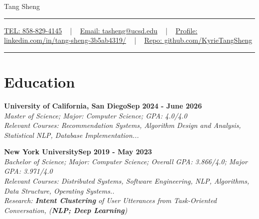 \documentclass[letterpaper,10pt]{article}
\newcommand{\documentTitle}[2]{
  \begin{center}
    {\Huge\color{accentTitle} #1}
    \vspace{10pt}
    {\color{accentLine} \hrule}
    \vspace{2pt}
    \footnotesize{#2}
    \vspace{2pt}
    {\color{accentLine} \hrule}
  \end{center}
}
\newcommand{\heading}[2]{
  \hspace{10pt}#1\hfill#2\\
}
\newcommand{\headingBf}[2]{
  \heading{\textbf{#1}}{\textbf{#2}}
}
\newcommand{\headingIt}[2]{
  \heading{\textit{#1}}{\textit{#2}}
}
\begin{document}

  \documentTitle{Tang Sheng}{
    \href{tel:8588294145}{
      \raisebox{-0.05\height} TEL: 858-829-4145} ~ | ~
    \href{tasheng@ucsd.edu}{
      \raisebox{-0.15\height} Email: tasheng@ucsd.edu} ~ | ~
     \href{https://www.linkedin.com/in/tang-sheng-3b5ab4319/}{
       \raisebox{-0.15\height} Profile: linkedin.com/in/tang-sheng-3b5ab4319/} ~ | ~
     \href{https://github.com/KyrieTangSheng}{
       \raisebox{-0.15\height} Repo: github.com/KyrieTangSheng}
}

  
  




  \section{Education}

  \headingBf{University of California, San Diego}{Sep 2024 - June 2026} 
  \headingIt{Master of Science; Major: Computer Science; GPA: 4.0/4.0}{}
  \headingIt{Relevant Courses: Recommendation Systems, Algorithm Design and Analysis, Statistical NLP, Database Implementation...}{}
  \vspace{0.5em} %

  \headingBf{New York University}{Sep 2019 - May 2023} 
  \headingIt{Bachelor of Science; Major: Computer Science; Overall GPA: 3.866/4.0; Major GPA: 3.971/4.0}{}
  \headingIt{Relevant Courses: Distributed Systems, Software Engineering, NLP, Algorithms, Data Structure, Operating Systems.. }{}
  \headingIt{Research: \textbf{Intent Clustering} of User Utterances from Task-Oriented Conversation, (\textbf{NLP; Deep Learning})}{}
\end{document}
